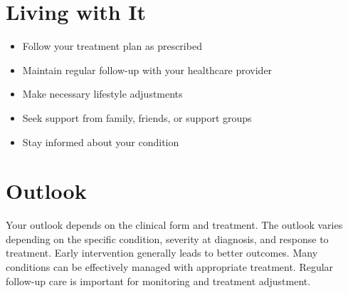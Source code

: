 \section{Living with It}
\begin{itemize}[noitemsep]
  \item Follow your treatment plan as prescribed
  \item Maintain regular follow-up with your healthcare provider
  \item Make necessary lifestyle adjustments
  \item Seek support from family, friends, or support groups
  \item Stay informed about your condition
\end{itemize}
\section{Outlook}
Your outlook depends on the clinical form and treatment. The outlook varies depending on the specific condition, severity at diagnosis, and response to treatment. Early intervention generally leads to better outcomes. Many conditions can be effectively managed with appropriate treatment. Regular follow-up care is important for monitoring and treatment adjustment.
